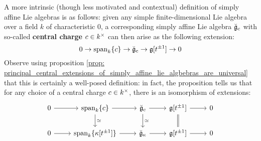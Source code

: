             \begin{remark} \label{remark: central_charges_and_inner_derivations}
                A more intrinsic (though less motivated and contextual) definition of simply affine Lie algebras is as follows: given any simple finite-dimensional Lie algebra over a field $k$ of characteristic $0$, a corresponding simply affine Lie algebra $\breve{\mathfrak{g}}_c$ with so-called \textbf{central charge} $c \in k^{\x}$ can then arise as the following extension:
                    $$0 \to \operatorname{span}_k \{c\} \to \breve{\mathfrak{g}}_c \to \mathfrak{g}[t^{\pm 1}] \to 0$$
                Observe using proposition \ref{prop: principal_central_extensions_of_simply_affine_lie_algbebras_are_universal} that this is certainly a well-posed definition: in fact, the proposition tells us that for any choice of a central charge $c \in k^{\x}$, there is an isomorphism of extensions:
                    $$
                        \begin{tikzcd}
                        	0 & {\span_k \{c\}} & {\breve{\g}_c} & {\g[t^{\pm 1}]} & 0 \\
                        	0 & {\span_k \{\kappa[t^{\pm 1}]\}} & {\breve{\g}_{\kappa}} & {\g[t^{\pm 1}]} & 0
                        	\arrow[from=2-1, to=2-2]
                        	\arrow[from=2-2, to=2-3]
                        	\arrow[from=2-3, to=2-4]
                        	\arrow[from=2-4, to=2-5]
                        	\arrow[from=1-1, to=1-2]
                        	\arrow[from=1-2, to=1-3]
                        	\arrow[from=1-3, to=1-4]
                        	\arrow[from=1-4, to=1-5]
                        	\arrow[Rightarrow, no head, from=2-4, to=1-4]
                        	\arrow["\cong", from=1-2, to=2-2]
                        	\arrow["\cong", from=1-3, to=2-3]
                        \end{tikzcd}
                    $$
            \end{remark}
            
